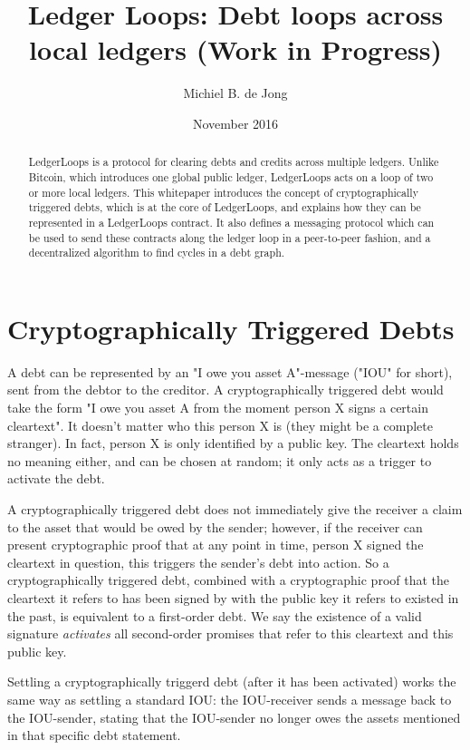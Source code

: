 \documentclass[11pt,twoside,a4paper]{article}
\begin{document}
\title{Ledger Loops: Debt loops across local ledgers (Work in Progress)}
\author{Michiel B. de Jong}
\date{November 2016}
\maketitle
\begin{abstract}
LedgerLoops is a protocol for clearing debts and credits across multiple ledgers. Unlike Bitcoin, which introduces one global public ledger, LedgerLoops acts on a loop of two or more local ledgers.
This whitepaper introduces the concept of cryptographically triggered debts, which is at the core of LedgerLoops, and explains how they can be represented in a LedgerLoops contract. It also defines a messaging protocol which can be used to send these contracts along the ledger loop in a peer-to-peer fashion, and a decentralized algorithm to find cycles in a debt graph.
\end{abstract}
\section{Cryptographically Triggered Debts}
A debt can be represented by an "I owe you asset A"-message ("IOU" for short), sent from the debtor to the creditor.
A cryptographically triggered debt would take the form "I owe you asset A from the moment person X signs a certain cleartext".
It doesn't matter who this person X is (they might be a complete stranger). In fact, person X is only identified by a public key. The cleartext holds no meaning either, and can be chosen at random; it only acts as a trigger to activate the debt.

A cryptographically triggered debt does not immediately give the receiver a claim to the asset that would be owed by the sender; however, if the receiver can present cryptographic proof that at any point in time,
person X signed the cleartext in question, this triggers the sender's debt into action.
So a cryptographically triggered debt, combined with a cryptographic proof that the cleartext it refers to has been signed by with the public key it refers to existed in the past, is equivalent to a first-order debt.
We say the existence of a valid signature {\em activates} all second-order promises that refer to this cleartext and this public key.

Settling a cryptographically triggerd debt (after it has been activated) works the same way as settling
a standard IOU: the IOU-receiver sends a message back to the IOU-sender, stating that the IOU-sender no longer owes
the assets mentioned in that specific debt statement.
\end{document}
